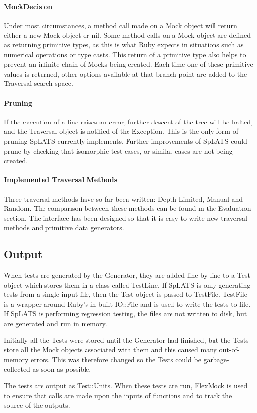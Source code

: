     \paragraph{MockDecision} Under most circumstances, a method call made on a Mock object will return either a new Mock object or nil. Some method calls on a Mock object are defined as returning primitive types, as this is what Ruby expects in situations such as numerical operations or type casts. This return of a primitive type also helps to prevent an infinite chain of Mocks being created. Each time one of these primitive values is returned, other options available at that branch point are added to the Traversal search space.    
    
    \paragraph{Pruning} If the execution of a line raises an error, further descent of the tree will be halted, and the Traversal object is notified of the Exception. This is the only form of pruning SpLATS currently implements. Further improvements of SpLATS could prune by checking that isomorphic test cases, or similar cases are not being created. 

    \paragraph{Implemented Traversal Methods} Three traversal methods have so far been written: Depth-Limited, Manual and Random. The comparison between these methods can be found in the Evaluation section. The interface has been designed so that it is easy to write new traversal methods and primitive data generators.

  \subsection{Output}
    When tests are generated by the Generator, they are added line-by-line to a Test object which stores them in a class called TestLine. If SpLATS is only generating tests from a single input file, then the Test object is passed to TestFile. TestFile is a wrapper around Ruby's in-built IO::File and is used to write the tests to file. If SpLATS is performing regression testing, the files are not written to disk, but are generated and run in memory.
    
    Initially all the Tests were stored until the Generator had finished, but the Tests store all the Mock objects associated with them and this caused many out-of-memory errors. This was therefore changed so the Tests could be garbage-collected as soon as possible.
    
    The tests are output as Test::Units. When these tests are run, FlexMock is used to ensure that calls are made upon the inputs of functions and to track the source of the outputs.
